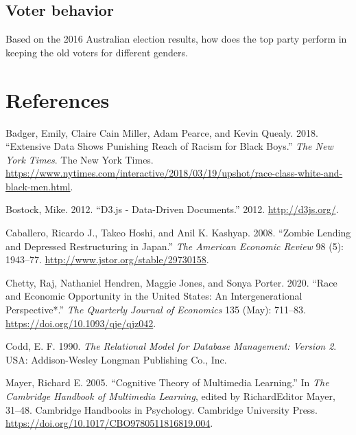 \hypertarget{voter-behavior}{%
\subsection{Voter behavior}\label{voter-behavior}}

Based on the 2016 Australian election results, how does the top party perform in keeping the old voters for different genders.

\hypertarget{references}{%
\section*{References}\label{references}}

\hypertarget{refs}{}
\begin{CSLReferences}{1}{0}
\leavevmode{}%
Badger, Emily, Claire Cain Miller, Adam Pearce, and Kevin Quealy. 2018. {``Extensive Data Shows Punishing Reach of Racism for Black Boys.''} \emph{The New York Times}. The New York Times. \url{https://www.nytimes.com/interactive/2018/03/19/upshot/race-class-white-and-black-men.html}.

\leavevmode{}%
Bostock, Mike. 2012. {``D3.js - Data-Driven Documents.''} 2012. \url{http://d3js.org/}.

\leavevmode{}%
Caballero, Ricardo J., Takeo Hoshi, and Anil K. Kashyap. 2008. {``Zombie Lending and Depressed Restructuring in Japan.''} \emph{The American Economic Review} 98 (5): 1943--77. \url{http://www.jstor.org/stable/29730158}.

\leavevmode{}%
Chetty, Raj, Nathaniel Hendren, Maggie Jones, and Sonya Porter. 2020. {``Race and Economic Opportunity in the United States: An Intergenerational Perspective*.''} \emph{The Quarterly Journal of Economics} 135 (May): 711--83. \url{https://doi.org/10.1093/qje/qjz042}.

\leavevmode{}%
Codd, E. F. 1990. \emph{The Relational Model for Database Management: Version 2}. USA: Addison-Wesley Longman Publishing Co., Inc.

\leavevmode{}%
Mayer, Richard E. 2005. {``Cognitive Theory of Multimedia Learning.''} In \emph{The Cambridge Handbook of Multimedia Learning}, edited by RichardEditor Mayer, 31--48. Cambridge Handbooks in Psychology. Cambridge University Press. \url{https://doi.org/10.1017/CBO9780511816819.004}.


\end{CSLReferences}
